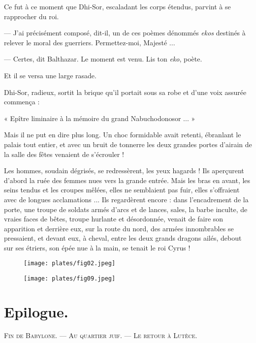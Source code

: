 \documentclass[a4paper, 11pt, oneside, polutonikogreek, french]{article}
\begin{document}
\bigskip
\centerline{\EightStarTaper}
\centerline{\EightStarTaper\EightStarTaper}
\bigskip

Ce fut à ce moment que Dhi-Sor, escaladant les corps étendus, parvint à se rapprocher du roi.

--- J'ai précisément composé, dit-il, un de ces poèmes dénommés \emph{ekos} destinés à relever le moral des guerriers. Permettez-moi, Majesté ...

--- Certes, dit Balthazar. Le moment est venu. Lis ton \emph{eko}, poète.

Et il se versa une large rasade.

Dhi-Sor, radieux, sortit la brique qu'il portait sous sa robe et d'une voix assurée commença :

« Epître liminaire à la mémoire du grand Nabuchodonosor ... »

Mais il ne put en dire plus long. Un choc formidable avait retenti, ébranlant le palais tout entier, et avec un bruit de tonnerre les deux grandes portes d'airain de la salle des fêtes venaient de s'écrouler !

Les hommes, soudain dégrisés, se redressèrent, les yeux hagards ! Ils aperçurent d'abord la ruée des femmes nues vers la grande entrée. Mais les bras en avant, les seins tendus et les croupes mêlées, elles ne semblaient pas fuir, elles s'offraient avec de longues acclamations ... Ils regardèrent encore : dans l'encadrement de la porte, une troupe de soldats armés d'arcs et de lances, sales, la barbe inculte, de vraies faces de bêtes, troupe hurlante et désordonnée, venait de faire son apparition et derrière eux, sur la route du nord, des armées innombrables se pressaient, et devant eux, à cheval, entre les deux grands dragons ailés, debout sur ses étriers, son épée nue à la main, se tenait le roi Cyrus !

\begin{figure}[H]
\centering
\texttt{[image: plates/fig02.jpeg]}
\end{figure}
\clearpage
\begin{figure}[H]
\centering
\texttt{[image: plates/fig09.jpeg]}
\end{figure}
\section{Epilogue.}
\begin{center}
\scshape
\small
Fin de Babylone. --- Au quartier juif. --- Le retour à Lutèce.
\end{center}
\end{document}
